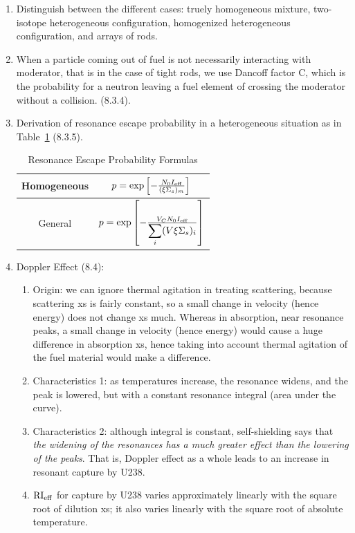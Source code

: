 \documentclass{school-22.211-notes}
\begin{document}
\begin{enumerate}
  \begin{enumerate}
    \item We define dilution xs as: $\sigma_d = \frac{N_m}{N_r} \sigma_m$ (8.2.1). 
    \item Two models for transforming a heterogeneous situation into a homogeneous one: 
      at very wide resonance (low energy), and at very narrow resonance (high energy). 
  \end{enumerate}
\item Distinguish between the different cases: truely homogeneous mixture, two-isotope heterogeneous configuration, homogenized heterogeneous configuration, and arrays of rods. 
\item When a particle coming out of fuel is not necessarily interacting with moderator, that is in the case of tight rods, we use Dancoff factor C, which is the probability for a neutron leaving a fuel element of crossing the moderator without a collision. (8.3.4).
\item Derivation of resonance escape probability in a heterogeneous situation as in Table~\ref{p-formulas} (8.3.5).
\begin{table}
  \centering
  \begin{tabular}{|c|c|} \hline
    Homogeneous & $p = \exp \left[ - \frac{N_0 I_{\mathrm{eff}}}{(\xi \Sigma_s)_m}  \right]$ \\ \hline
    General & $p = \exp \left[ - \frac{V_C N_0 I_{\mathrm{eff}}}{\displaystyle\sum_i (V \xi \Sigma_s)_i}  \right]$ \\  \hline
  \end{tabular}
  \caption{Resonance Escape Probability Formulas} \label{p-formulas}
\end{table}
\item Doppler Effect (8.4):
  \begin{enumerate}
  \item Origin: we can ignore thermal agitation in treating scattering, because scattering xs is fairly constant, so a small change in velocity (hence energy) does not change xs much. Whereas in absorption, near resonance peaks, a small change in velocity (hence energy) would cause a huge difference in absorption xs, hence taking into account thermal agitation of the fuel material would make a difference. 
  \item Characteristics 1: as temperatures increase, the resonance widens, and the peak is lowered, but with a constant resonance integral (area under the curve). 
  \item Characteristics 2: although integral is constant, self-shielding says that \textit{the widening of the resonances has a much greater effect than the lowering of the peaks}. That is, Doppler effect as a whole leads to an increase in resonant capture by U238. 
  \item $\mathrm{RI}_{\mathrm{eff}}$ for capture by U238 varies approximately linearly with the square root of dilution xs; it also varies linearly with the square root of absolute temperature. 
  \end{enumerate}
\end{enumerate}
\end{document}

